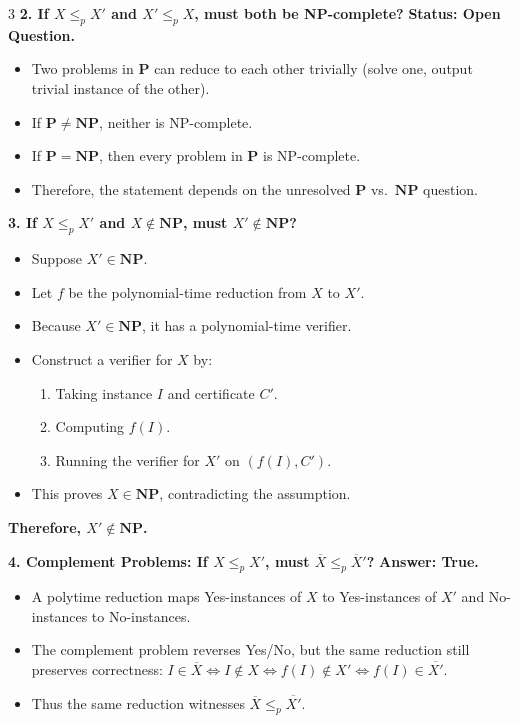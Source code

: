 \documentclass[letterpaper]{article}
\begin{document}
\begin{multicols*}{3}
    \textbf{2. If $X \le_p X'$ and $X' \le_p X$, must both be NP-complete?}
    \textbf{Status: Open Question.}

    \begin{itemize}
        \item Two problems in $\mathbf{P}$ can reduce to each other trivially (solve one, output trivial instance of the other).
        \item If $\mathbf{P} \ne \mathbf{NP}$, neither is NP-complete.
        \item If $\mathbf{P} = \mathbf{NP}$, then every problem in $\mathbf{P}$ is NP-complete.
        \item Therefore, the statement depends on the unresolved $\mathbf{P}$ vs.\ $\mathbf{NP}$ question.
    \end{itemize}

    \textbf{3. If $X \le_p X'$ and $X \notin \mathbf{NP}$, must $X' \notin \mathbf{NP}$?}

    \begin{itemize}
        \item Suppose $X' \in \mathbf{NP}$.
        \item Let $f$ be the polynomial-time reduction from $X$ to $X'$.
        \item Because $X' \in \mathbf{NP}$, it has a polynomial-time verifier.
        \item Construct a verifier for $X$ by:
              \begin{enumerate}
                  \item Taking instance $I$ and certificate $C'$.
                  \item Computing $f(I)$.
                  \item Running the verifier for $X'$ on $(f(I), C')$.
              \end{enumerate}
        \item This proves $X \in \mathbf{NP}$, contradicting the assumption.
    \end{itemize}

    \textbf{Therefore, $X' \notin \mathbf{NP}$.}

    \textbf{4. Complement Problems: If $X \le_p X'$, must $\overline{X} \le_p \overline{X}'$?}
    \textbf{Answer: True.}

    \begin{itemize}
        \item A polytime reduction maps Yes-instances of $X$ to Yes-instances of $X'$ and
              No-instances to No-instances.
        \item The complement problem reverses Yes/No, but the same reduction still preserves correctness:
              $
                  I \in \overline{X} \iff I \notin X \iff f(I) \notin X' \iff f(I) \in \overline{X'}.
              $
        \item Thus the same reduction witnesses $\overline{X} \le_p \overline{X'}$.
    \end{itemize}


\end{multicols*}
\end{document}
